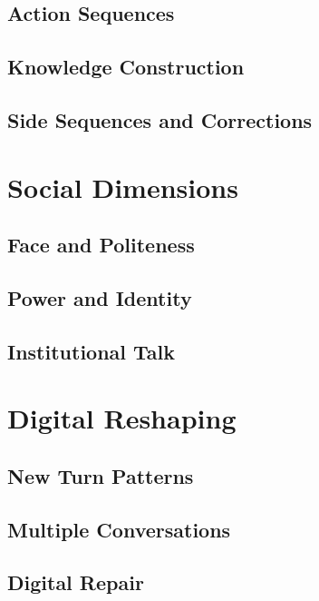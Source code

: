 \subsection{Action Sequences} \label{subsec:action-seq}
\subsection{Knowledge Construction} \label{subsec:knowledge}
\subsection{Side Sequences and Corrections} \label{subsec:side-seq}

\section{Social Dimensions} \label{sec:social}
\subsection{Face and Politeness} \label{subsec:face}
\subsection{Power and Identity} \label{subsec:power}
\subsection{Institutional Talk} \label{subsec:institutional}

\section{Digital Reshaping} \label{sec:digital}
\subsection{New Turn Patterns} \label{subsec:new-turns}
\subsection{Multiple Conversations} \label{subsec:multiple}
\subsection{Digital Repair} \label{subsec:digital-repair}